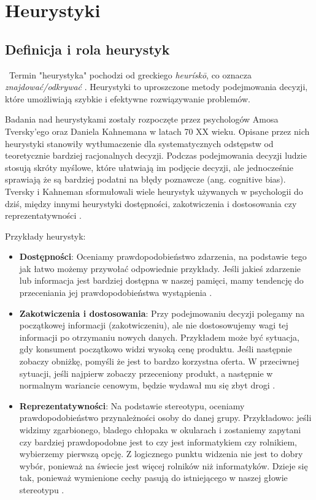 \newpage %
\section{Heurystyki}

\subsection{Definicja i rola heurystyk}
\indent\ Termin "heurystyka" pochodzi od greckiego \emph{heurískō}, co oznacza \emph{znajdować/odkrywać} \cite{heuristicEtymology}. Heurystyki to uproszczone metody podejmowania decyzji, które umożliwiają szybkie i efektywne rozwiązywanie problemów.

Badania nad heurystykami zostały rozpoczęte przez psychologów Amosa Tversky'ego oraz Daniela Kahnemana w latach 70 XX wieku. Opisane przez nich heurystyki stanowiły wytłumaczenie dla systematycznych odstępstw od teoretycznie bardziej racjonalnych decyzji. Podczas podejmowania decyzji ludzie stosują skróty myślowe, które ułatwiają im podjęcie decyzji, ale jednocześnie sprawiają że są bardziej podatni na błędy poznawcze (ang. cognitive bias). Tversky i Kahneman sformułowali wiele heurystyk używanych w psychologii do dziś, między innymi heurystyki dostępności, zakotwiczenia i dostosowania czy reprezentatywności \cite{tversky74} \cite{psychol} \cite{laibson}.

Przykłady heurystyk:
\begin{itemize}
    \item{\textbf{Dostępności}}: Oceniamy prawdopodobieństwo zdarzenia, na podstawie tego jak łatwo możemy przywołać odpowiednie przykłady. Jeśli jakieś zdarzenie lub informacja jest bardziej dostępna w naszej pamięci, mamy tendencję do przeceniania jej prawdopodobieństwa wystąpienia \cite{tversky74}.
    \item{\textbf{Zakotwiczenia i dostosowania}}: Przy podejmowaniu decyzji polegamy na początkowej informacji (zakotwiczeniu), ale nie dostosowujemy wagi tej informacji po otrzymaniu nowych danych. Przykładem może być sytuacja, gdy konsument początkowo widzi wysoką cenę produktu. Jeśli następnie zobaczy obniżkę, pomyśli że jest to bardzo korzystna oferta. W przeciwnej sytuacji, jeśli najpierw zobaczy przeceniony produkt, a następnie w normalnym wariancie cenowym, będzie wydawał mu się zbyt drogi \cite{tversky74, pricing}.
    \item{\textbf{Reprezentatywności}}: Na podstawie stereotypu, oceniamy prawdopodobieństwo przynależności osoby do danej grupy. Przykładowo: jeśli widzimy zgarbionego, bladego chłopaka w okularach i zostaniemy zapytani czy bardziej prawdopodobne jest to czy jest informatykiem czy rolnikiem, wybierzemy pierwszą opcję. Z logicznego punktu widzenia nie jest to dobry wybór, ponieważ na świecie jest więcej rolników niż informatyków. Dzieje się tak, ponieważ wymienione cechy pasują do istniejącego w naszej głowie stereotypu \cite{tversky74} \cite{sudeep}.
\end{itemize}


